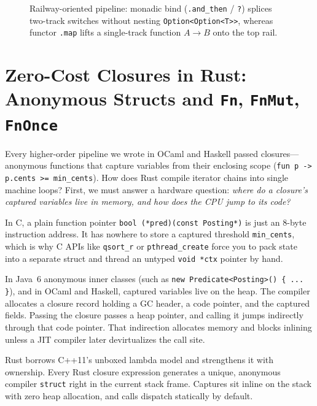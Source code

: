 \begin{figure}[H]
\caption{Railway-oriented pipeline: monadic bind (\texttt{.and\_then} / \texttt{?}) splices two-track switches without nesting \texttt{Option<Option<T>>}, whereas functor \texttt{.map} lifts a single-track function $A \to B$ onto the top rail.}
\label{ch07:fig-railway-monad}
\end{figure}


\section{Zero-Cost Closures in Rust: Anonymous Structs and \texttt{Fn}, \texttt{FnMut}, \texttt{FnOnce}}
\label{ch07:rust-closures}

Every higher-order pipeline we wrote in OCaml and Haskell passed closures---anonymous
functions that capture variables from their enclosing scope (\texttt{fun p -> p.cents >= min\_cents}).
How does Rust compile iterator chains into single machine loops? First, we must answer a hardware question: \emph{where do a closure's captured variables
live in memory, and how does the CPU jump to its code?}

In C, a plain function pointer \texttt{bool (*pred)(const Posting*)} is just an 8-byte
instruction address. It has nowhere to store a captured threshold \texttt{min\_cents},
which is why C APIs like \texttt{qsort\_r} or \texttt{pthread\_create} force you to
pack state into a separate struct and thread an untyped \texttt{void *ctx} pointer
by hand.

In Java~6 anonymous inner classes (such as \texttt{new Predicate<Posting>() \{ ... \}}), and in OCaml and Haskell, captured variables live on the heap. The compiler allocates a closure record holding a GC header, a code pointer, and the captured fields. Passing the closure passes a heap pointer, and calling it jumps indirectly through that code pointer. That indirection allocates memory and blocks inlining unless a JIT compiler later devirtualizes the call site.

Rust borrows C++11's unboxed lambda model and strengthens it with ownership. Every Rust closure expression generates a unique, anonymous compiler \texttt{struct} right in the current stack frame. Captures sit inline on the stack with zero heap allocation, and calls dispatch statically by default.

